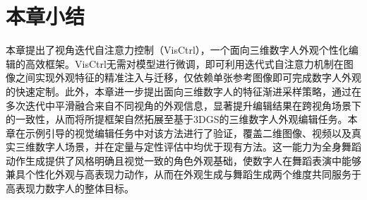 
\section{本章小结}
本章提出了视角迭代自注意力控制（VisCtrl），一个面向三维数字人外观个性化编辑的高效框架。VisCtrl无需对模型进行微调，即可利用迭代式自注意力机制在图像之间实现外观特征的精准注入与迁移，仅依赖单张参考图像即可完成数字人外观的快速定制。此外，本章进一步提出面向三维数字人的特征渐进采样策略，通过在多次迭代中平滑融合来自不同视角的外观信息，显著提升编辑结果在跨视角场景下的一致性，从而将所提框架自然拓展至基于3DGS的三维数字人外观编辑任务。本章在示例引导的视觉编辑任务中对该方法进行了验证，覆盖二维图像、视频以及真实三维数字人场景，并在定量与定性评估中均优于现有方法。这一能力为全身舞蹈动作生成提供了风格明确且视觉一致的角色外观基础，使数字人在舞蹈表演中能够兼具个性化外观与高表现力动作，从而在外观生成与舞蹈生成两个维度共同服务于高表现力数字人的整体目标。
